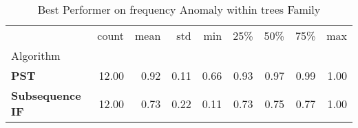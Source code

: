 \begin{table}
\caption{Best Performer on frequency Anomaly within trees Family}
\label{tab:bp-frequency_trees}
\begin{tabular}{lrrrrrrrr}
\toprule
 & count & mean & std & min & 25\% & 50\% & 75\% & max \\
Algorithm &  &  &  &  &  &  &  &  \\
\midrule
\textbf{PST} & 12.00 & 0.92 & 0.11 & 0.66 & 0.93 & 0.97 & 0.99 & 1.00 \\
\textbf{Subsequence IF} & 12.00 & 0.73 & 0.22 & 0.11 & 0.73 & 0.75 & 0.77 & 1.00 \\
\bottomrule
\end{tabular}
\end{table}
